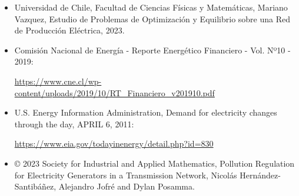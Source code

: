\documentclass[12pt,twoside]{article}
\begin{document}
	\begin{itemize}
		\item Universidad de Chile, Facultad de Ciencias F\'isicas y Matem\'aticas, Mariano Vazquez, Estudio de Problemas de Optimizaci\'on y Equilibrio sobre una Red de Producci\'on El\'ectrica, 2023.
		
		\item Comisión Nacional de Energía - Reporte Energético Financiero - Vol. Nº10 - 2019:
		
		\href{https://www.cne.cl/wp-content/uploads/2019/10/RT_Financiero_v201910.pdf}{https://www.cne.cl/wp-content/uploads/2019/10/RT\_Financiero\_v201910.pdf}
		
		\item U.S. Energy Information Administration, Demand for electricity changes through the day, APRIL 6, 2011: 
		
		\href{https://www.eia.gov/todayinenergy/detail.php?id=830}{https://www.eia.gov/todayinenergy/detail.php?id=830}
		
		\item © 2023 Society for Industrial and Applied Mathematics, Pollution Regulation for Electricity Generators in a Transmission Network, Nicol\'as Hern\'andez-Santib\'a\~{n}ez, Alejandro Jofr\'e and Dylan Posamma.	
	\end{itemize}
\end{document}
